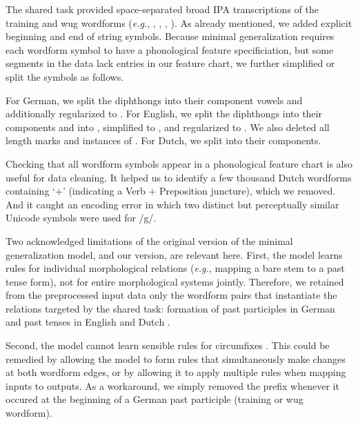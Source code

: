 \documentclass[11pt]{article}
\begin{document}
The shared task provided space-separated broad IPA transcriptions of the training and wug wordforms (\emph{e.g.}, , , , ). As already mentioned, we added explicit beginning and end of string symbols. Because minimal generalization requires each wordform symbol to have a phonological feature specificiation, but some segments in the data lack entries in our feature chart, we further simplified or split the symbols as follows.

For German, we split the diphthongs  into their component vowels and additionally regularized  to . For English, we split the diphthongs  into their components and \textipa{/3\textrhoticity/} into , simplified  to , and regularized  to . We also deleted all length marks \textipa{/:/} and instances of . For Dutch, we split  into their components.

Checking that all wordform symbols appear in a phonological feature chart is also useful for data cleaning. It helped us to identify a few thousand  Dutch wordforms containing `$+$' (indicating a Verb $+$ Preposition juncture), which we removed. And it caught an encoding error in which two distinct but perceptually similar Unicode symbols were used for /g/.

Two acknowledged limitations of the original version of the minimal generalization model, and our version, are relevant here. First, the model learns rules for individual morphological relations (\emph{e.g.}, mapping a bare stem to a past tense form), not for entire morphological systems jointly. Therefore, we retained from the preprocessed input data only the wordform pairs that instantiate the relations targeted by the shared task: formation of past participles in German \citep{clahsen1999} and past tenses in English and Dutch \citep{booij2019}.

Second, the model cannot learn sensible rules for circumfixes \citep[][\S5.2]{albright-hayes-2002-modeling}. This could be remedied by allowing the model to form rules that simultaneously make changes at both wordform edges, or by allowing it to apply multiple rules when mapping inputs to outputs. As a workaround, we simply removed the prefix  whenever it occured at the beginning of a German past participle (training or wug wordform).
\end{document}
